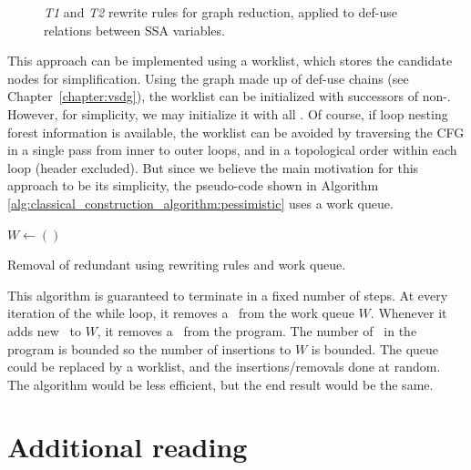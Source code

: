 {\begin{figure}
  \caption{\label{fig:t1t2transforms}\emph{T1} and \emph{T2} rewrite
  rules for graph reduction, applied to def-use relations between SSA 
  variables.}
\end{figure}

This approach can be implemented using a worklist, 
which stores the candidate nodes for simplification.
Using the graph made up of def-use chains (see Chapter~\ref{chapter:vsdg}), 
the worklist can be initialized with successors of non-\phifuns.
However, for simplicity, we may initialize it with all \phifuns.
Of course, if loop nesting forest
information is available, 
the worklist can be avoided by traversing the CFG in a single pass 
from inner to outer loops, and in a topological order within each loop (header excluded).
But since we believe the main motivation for this approach to be its
simplicity,
the pseudo-code shown in Algorithm 
\ref{alg:classical_construction_algorithm:pessimistic} uses a work queue.


\begin{algorithm}[h]
$W \leftarrow ()$ \;
\caption{\label{alg:classical_construction_algorithm:pessimistic}
Removal of redundant \phifuns using rewriting rules and work queue.}
\end{algorithm}

This algorithm is guaranteed to terminate in a fixed number of steps.
At every iteration of the while loop, it removes a \phifun\ from the
work queue
$W$. Whenever it adds new \phifuns\ to $W$, it removes a \phifun\ from
the program.
The number of \phifuns\ in 
the program is bounded so the number of insertions to $W$ is bounded.
The queue could be replaced by a worklist, and the insertions/removals
done at random. The algorithm would be less efficient, but the
end result would be the same.

\section{Additional reading}
\label{sec:classical_construction_algorithm:reading}

}
